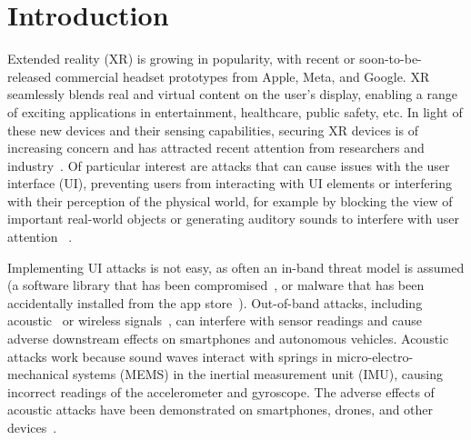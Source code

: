 \section{Introduction}
\label{sec:intro}




Extended reality (XR) is growing in popularity, with recent or soon-to-be-released commercial headset prototypes from Apple, Meta, and Google.
XR seamlessly blends real and virtual content on the user's display, enabling a range of exciting applications in entertainment, healthcare, public safety, etc.
In light of these new devices and their sensing capabilities, securing XR devices is of increasing concern and has attracted recent attention from researchers and industry~\cite{lebeck2017securing,ruth2019secure,corbett2023bystandar,rajaram2023eliciting,rajaram2023reframe}.
Of particular interest are attacks that can cause issues with the user interface (UI), preventing users from interacting with UI elements or interfering with their perception of the physical world, for example by blocking the view of important real-world objects or generating auditory sounds to interfere with user attention ~\cite{cheng2024user,cheng2023exploring,lebeck2017securing}.

Implementing UI attacks is not easy, as often an in-band threat model is assumed (\eg a software library that has been compromised~\cite{cheng2023exploring}, or malware that has been accidentally installed from the app store~\cite{slocum2023going}).
Out-of-band attacks, including acoustic~\cite{trippel2017walnut,tu2018injected} or wireless signals~\cite{davidson2016controlling,gluck2020spoofing},
can interfere with sensor readings and cause adverse downstream effects on smartphones and autonomous vehicles.
Acoustic attacks work because sound waves interact with springs in micro-electro-mechanical systems (MEMS) in the inertial measurement unit (IMU), causing incorrect readings of the accelerometer and gyroscope.
The adverse effects of acoustic attacks have been demonstrated on smartphones, drones, and other devices~\cite{son2015rocking,tu2018injected}.

